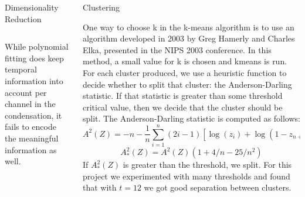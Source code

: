 \documentclass[final,t]{beamer}
\begin{document}
\begin{frame}{}
\begin{columns}[t]
\begin{column}{.3\linewidth}
\begin{block}{Dimensionality Reduction}
\begin{columns}[c]
     \end{columns}
     While polynomial fitting \alert{does keep temporal information} into
     account per channel in the condensation, it \alert{fails to encode the
     meaningful information as well}.

     \end{block}
   \end{column}
   
    
    \begin{column}{.3\linewidth}
      \begin{block}{Clustering}
        \par
        One way to choose k in the k-means algorithm is to use an algorithm
developed in 2003 by Greg Hamerly and Charles Elka, presented in the NIPS
2003 conference. In this method, a small value for k is
chosen and kmeans is run. For each cluster produced, we use a
heuristic function to decide whether to split that cluster: the
Anderson-Darling statistic. If that statistic is greater than
some threshold critical value, then we decide that the cluster should be
split. The Anderson-Darling statistic is computed as follows:
$$
A^2(Z) = -n - \frac{1}{n}\sum_{i=1}^n (2i -
1)[\log(z_i)+\log(1-z_{n+1-i})]
$$$$
A^2_*(Z) = A^2(Z)(1 + 4/n - 25/n^2)
$$
If $A^2_*(Z)$ is greater than the threshold, we split. For this
project we experimented with many thresholds and found that with $t=12$ we
got good separation between clusters.


\end{block}
\end{column}
\end{columns}
\end{frame}
\end{document}
